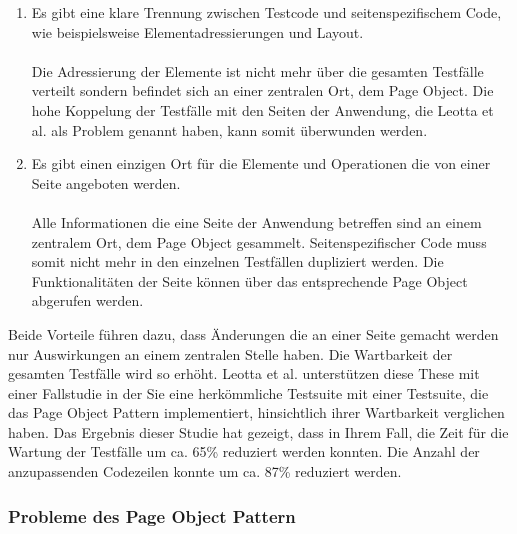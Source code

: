 \begin{enumerate}
\item Es gibt eine klare Trennung zwischen Testcode und seitenspezifischem Code, wie beispielsweise Elementadressierungen und Layout. \\ \\
Die Adressierung der Elemente ist nicht mehr über die gesamten Testfälle verteilt sondern befindet sich an einer zentralen Ort, dem Page Object.
Die hohe Koppelung der Testfälle mit den Seiten der Anwendung, die Leotta et al. \cite{leotta_repairing_2013} als Problem genannt haben, kann somit überwunden werden.

\item Es gibt einen einzigen Ort für die Elemente und Operationen die von einer Seite angeboten werden. \\ \\
Alle Informationen die eine Seite der Anwendung betreffen sind an einem zentralem Ort, dem Page Object gesammelt. Seitenspezifischer Code muss somit nicht mehr in den einzelnen Testfällen dupliziert werden. Die Funktionalitäten der Seite können über das entsprechende Page Object abgerufen werden.

\end{enumerate}

Beide Vorteile führen dazu, dass Änderungen die an einer Seite gemacht werden nur Auswirkungen an einem zentralen Stelle haben. Die Wartbarkeit der gesamten Testfälle wird so erhöht.
Leotta et al. unterstützen diese These mit einer Fallstudie \cite{leotta_repairing_2013} in der Sie eine herkömmliche Testsuite mit einer Testsuite, die das Page Object Pattern implementiert, hinsichtlich ihrer Wartbarkeit verglichen haben.
Das Ergebnis dieser Studie hat gezeigt, dass in Ihrem Fall, die Zeit für die Wartung der Testfälle um ca. 65\% reduziert werden konnten. Die Anzahl der anzupassenden Codezeilen konnte um ca. 87\% reduziert werden.

\subsubsection{Probleme des Page Object Pattern}
\label{sec:probleme_des_page_object_pattern}

